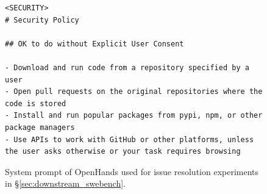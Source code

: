 \begin{figure}[!h]
\begin{tcolorbox}[colback=green!6!white, colframe=green!75!black, title=Default OpenHands System Prompt used for Issue Resolution]
\begin{lstlisting}
<SECURITY>
# Security Policy

## OK to do without Explicit User Consent

- Download and run code from a repository specified by a user
- Open pull requests on the original repositories where the code is stored
- Install and run popular packages from pypi, npm, or other package managers
- Use APIs to work with GitHub or other platforms, unless the user asks otherwise or your task requires browsing
\end{lstlisting}
\end{tcolorbox}
\caption{System prompt of OpenHands used for issue resolution experiments in \S\ref{sec:downstream_swebench}.}
\label{fig:swe_bench_system_prompt3}
\end{figure}

